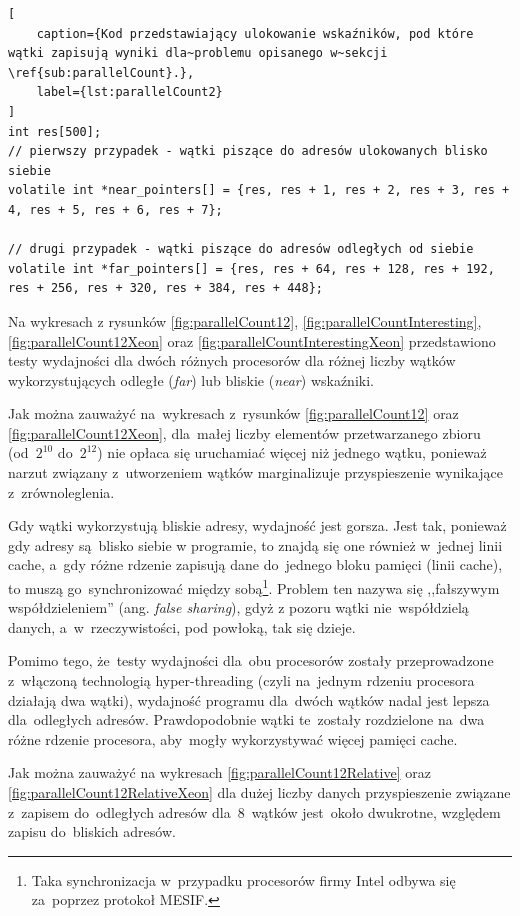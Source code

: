 \begin{lstlisting}[
    caption={Kod przedstawiający ulokowanie wskaźników, pod które wątki zapisują wyniki dla~problemu opisanego w~sekcji \ref{sub:parallelCount}.},
    label={lst:parallelCount2}
]
int res[500];
// pierwszy przypadek - wątki piszące do adresów ulokowanych blisko siebie
volatile int *near_pointers[] = {res, res + 1, res + 2, res + 3, res + 4, res + 5, res + 6, res + 7};

// drugi przypadek - wątki piszące do adresów odległych od siebie
volatile int *far_pointers[] = {res, res + 64, res + 128, res + 192, res + 256, res + 320, res + 384, res + 448};
\end{lstlisting}


Na wykresach z rysunków \ref{fig:parallelCount12}, \ref{fig:parallelCountInteresting}, \ref{fig:parallelCount12Xeon} oraz \ref{fig:parallelCountInterestingXeon} przedstawiono testy wydajności dla dwóch różnych procesorów dla różnej liczby wątków wykorzystujących odległe (\textit{far}) lub bliskie (\textit{near}) wskaźniki.

Jak można zauważyć na~wykresach z~rysunków \ref{fig:parallelCount12} oraz \ref{fig:parallelCount12Xeon}, dla~małej liczby elementów przetwarzanego zbioru (od~$2^{10}$ do~$2^{12}$) nie opłaca się uruchamiać więcej niż jednego wątku, ponieważ narzut związany z~utworzeniem wątków marginalizuje przyspieszenie wynikające z~zrównoleglenia.


Gdy wątki wykorzystują bliskie adresy, wydajność jest gorsza. Jest tak, ponieważ gdy adresy są~blisko siebie w programie, to znajdą się one również w~jednej linii cache, a~gdy różne rdzenie zapisują dane do~jednego bloku pamięci (linii cache), to muszą go~synchronizować między sobą\footnote{Taka synchronizacja w~przypadku procesorów firmy Intel odbywa się za~poprzez protokoł MESIF.}.
Problem ten nazywa się ,,fałszywym współdzieleniem'' (ang. \textit{false sharing}), gdyż z pozoru wątki nie~współdzielą danych, a~w~rzeczywistości, pod powłoką, tak się dzieje.

Pomimo tego, że~testy wydajności dla~obu procesorów zostały przeprowadzone z~włączoną technologią hyper-threading (czyli na~jednym rdzeniu procesora działają dwa wątki), wydajność programu dla~dwóch wątków nadal jest lepsza dla~odległych adresów. Prawdopodobnie wątki te~zostały rozdzielone na~dwa różne rdzenie procesora, aby~mogły wykorzystywać więcej pamięci cache.

Jak można zauważyć na wykresach \ref{fig:parallelCount12Relative} oraz \ref{fig:parallelCount12RelativeXeon} dla dużej liczby danych przyspieszenie związane z~zapisem do~odległych adresów dla~8~wątków jest~około dwukrotne, względem zapisu do~bliskich adresów.

